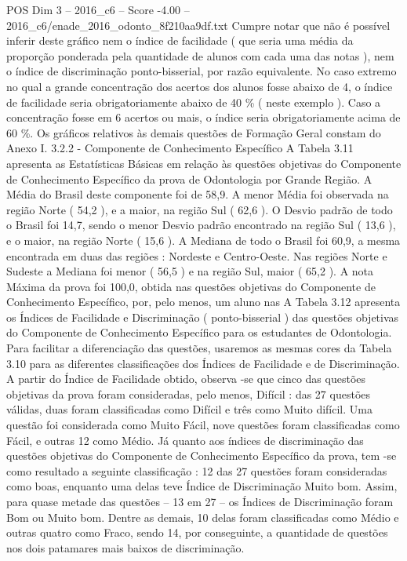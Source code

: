 \begin{textsample}{POS Dim 3 – 2016\_c6 – Score -4.00 – 2016\_c6/enade\_2016\_odonto\_8f210aa9df.txt}
Cumpre notar que não é possível inferir deste gráfico nem o índice de facilidade ( que seria uma média da proporção ponderada pela quantidade de alunos com cada uma das notas ), nem o índice de discriminação ponto-bisserial, por razão equivalente.
No caso extremo no qual a grande concentração dos acertos dos alunos fosse abaixo de 4, o índice de facilidade seria obrigatoriamente abaixo de 40 \% ( neste exemplo ).
Caso a concentração fosse em 6 acertos ou mais, o índice seria obrigatoriamente acima de 60 \%.
Os gráficos relativos às demais questões de Formação Geral constam do Anexo I. 3.2.2 - Componente de Conhecimento Específico A Tabela 3.11 apresenta as Estatísticas Básicas em relação às questões objetivas do Componente de Conhecimento Específico da prova de Odontologia por Grande Região.
A Média do Brasil deste componente foi de 58,9.
A menor Média foi observada na região Norte ( 54,2 ), e a maior, na região Sul ( 62,6 ).
O Desvio padrão de todo o Brasil foi 14,7, sendo o menor Desvio padrão encontrado na região Sul ( 13,6 ), e o maior, na região Norte ( 15,6 ).
A Mediana de todo o Brasil foi 60,9, a mesma encontrada em duas das regiões : Nordeste e Centro-Oeste.
Nas regiões Norte e Sudeste a Mediana foi menor ( 56,5 ) e na região Sul, maior ( 65,2 ).
A nota Máxima da prova foi 100,0, obtida nas questões objetivas do Componente de Conhecimento Específico, por, pelo menos, um aluno nas A Tabela 3.12 apresenta os Índices de Facilidade e Discriminação ( ponto-bisserial ) das questões objetivas do Componente de Conhecimento Específico para os estudantes de Odontologia.
Para facilitar a diferenciação das questões, usaremos as mesmas cores da Tabela 3.10 para as diferentes classificações dos Índices de Facilidade e de Discriminação.
A partir do Índice de Facilidade obtido, observa -se que cinco das questões objetivas da prova foram consideradas, pelo menos, Difícil : das 27 questões válidas, duas foram classificadas como Difícil e três como Muito difícil.
Uma questão foi considerada como Muito Fácil, nove questões foram classificadas como Fácil, e outras 12 como Médio.
Já quanto aos índices de discriminação das questões objetivas do Componente de Conhecimento Específico da prova, tem -se como resultado a seguinte classificação : 12 das 27 questões foram consideradas como boas, enquanto uma delas teve Índice de Discriminação Muito bom.
Assim, para quase metade das questões – 13 em 27 – os Índices de Discriminação foram Bom ou Muito bom.
Dentre as demais, 10 delas foram classificadas como Médio e outras quatro como Fraco, sendo 14, por conseguinte, a quantidade de questões nos dois patamares mais baixos de discriminação.

\end{textsample}
